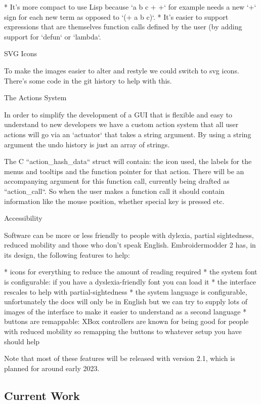 \documentclass[a4paper]{report}
\begin{document}
{{* It's more compact to use Lisp because `a b c + +` for example needs a new `+` sign for each new term as opposed to `(+ a b c)`.
* It's easier to support expressions that are themselves function calls defined by the user (by adding support for `defun` or `lambda`.

SVG Icons
~~~~~~~~~

To make the images easier to alter and restyle we could
switch to svg icons. There's some code in the git history
to help with this.

The Actions System
~~~~~~~~~~~~~~~~~~

In order to simplify the development of a GUI that is flexible and
easy to understand to new developers we have a custom action system that all
user actions will go via an `actuator` that takes a string argument. By using a
string argument the undo history is just an array of strings.

The C ``action_hash_data`` struct will contain: the icon used, the labels for the
menus and tooltips and the function pointer for that action.
There will be an accompanying argument for this function call, currently being
drafted as ``action_call``. So when the user makes a function call it should
contain information like the mouse position, whether special key is pressed
etc.

Accessibility
~~~~~~~~~~~~~

Software can be more or less friendly to people with dylexia, partial sightedness,
reduced mobility and those who don't speak English.
Embroidermodder 2 has, in its design, the following features to help:

* icons for everything to reduce the amount of reading required
* the system font is configurable: if you have a dyslexia-friendly font you can load it
* the interface rescales to help with partial-sightedness
* the system language is configurable, unfortunately the docs will only be in English but we can try to supply lots of images of the interface to make it easier to understand as a second language
* buttons are remappable: XBox controllers are known for being good for people with reduced mobility so remapping the buttons to whatever setup you have should help

Note that most of these features will be released with version 2.1, which is planned for around early 2023.

\subsection{Current Work}
~~~~~~~~~~~~~~~~~~~~~~~~~~~~~~~~~~~~~~

}}
\end{document}
